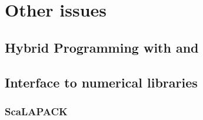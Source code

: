 \chapter{Other issues}

\section{Hybrid Programming with \MPI and \OMP}

\subsection{\MPI}

\subsection{\OMP}

\section{Interface to numerical libraries}

\subsection{ScaLAPACK}

